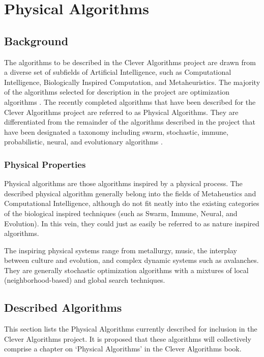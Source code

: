 \documentclass[a4paper, 11pt]{article}
\begin{document}
\section{Physical Algorithms}
\label{sec:algorithms}

% 
% 
\subsection{Background}
The algorithms to be described in the Clever Algorithms project are drawn from a diverse set of subfields of Artificial Intelligence, such as Computational Intelligence, Biologically Inspired Computation, and Metaheuristics. The majority of the algorithms selected for description in the project are optimization algorithms \cite{Brownlee2010b}. 
The recently completed algorithms that have been described for the Clever Algorithms project are referred to as Physical Algorithms. They are differentiated from the remainder of the algorithms described in the project that have been designated a taxonomy including swarm, stochastic, immune, probabilistic, neural, and evolutionary algorithms \cite{Brownlee2010b}. 

\subsubsection{Physical Properties}
Physical algorithms are those algorithms inspired by a physical process. The described physical algorithm generally belong into the fields of Metaheustics and Computational Intelligence, although do not fit neatly into the existing categories of the biological inspired techniques (such as Swarm, Immune, Neural, and Evolution). In this vein, they could just as easily be referred to as nature inspired algorithms.

The inspiring physical systems range from metallurgy, music, the interplay between culture and evolution, and complex dynamic systems such as avalanches. They are generally stochastic optimization algorithms with a mixtures of local (neighborhood-based) and global search techniques. 

% 
% 
\subsection{Described Algorithms}
\label{subsec:algorithms}
This section lists the Physical Algorithms currently described for inclusion in the Clever Algorithms project. It is proposed that these algorithms will collectively comprise a chapter on `Physical Algorithms' in the Clever Algorithms book. 
\end{document}
